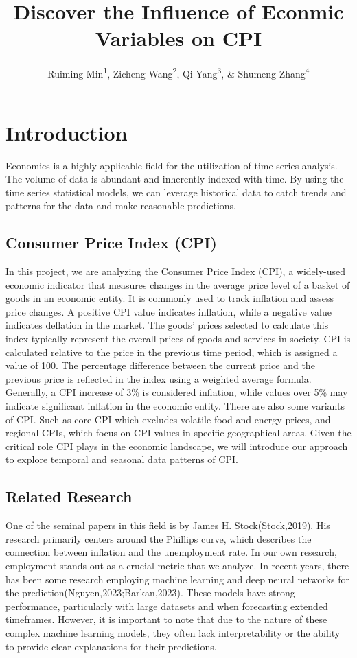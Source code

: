 \documentclass[
  man,floatsintext,
  man]{apa6}
\title{Discover the Influence of Econmic Variables on CPI}
\author{Ruiming Min\textsuperscript{1}, Zicheng Wang\textsuperscript{2}, Qi Yang\textsuperscript{3}, \& Shumeng Zhang\textsuperscript{4}}
\date{}
\affiliation{\vspace{0.5cm}\textsuperscript{5} UIUC}
\begin{document}
\maketitle

\section{Introduction}\label{introduction}

Economics is a highly applicable field for the utilization of time series analysis. The volume of data is abundant and inherently indexed with time. By using the time series statistical models, we can leverage historical data to catch trends and patterns for the data and make reasonable predictions.

\subsection{Consumer Price Index (CPI)}\label{consumer-price-index-cpi}

In this project, we are analyzing the Consumer Price Index (CPI), a widely-used economic indicator that measures changes in the average price level of a basket of goods in an economic entity. It is commonly used to track inflation and assess price changes. A positive CPI value indicates inflation, while a negative value indicates deflation in the market. The goods' prices selected to calculate this index typically represent the overall prices of goods and services in society.
CPI is calculated relative to the price in the previous time period, which is assigned a value of 100. The percentage difference between the current price and the previous price is reflected in the index using a weighted average formula. Generally, a CPI increase of 3\% is considered inflation, while values over 5\% may indicate significant inflation in the economic entity. There are also some variants of CPI. Such as core CPI which excludes volatile food and energy prices, and regional CPIs, which focus on CPI values in specific geographical areas.
Given the critical role CPI plays in the economic landscape, we will introduce our approach to explore temporal and seasonal data patterns of CPI.

\subsection{Related Research}\label{related-research}

One of the seminal papers in this field is by James H. Stock(Stock,2019). His research primarily centers around the Phillips curve, which describes the connection between inflation and the unemployment rate. In our own research, employment stands out as a crucial metric that we analyze.
In recent years, there has been some research employing machine learning and deep neural networks for the prediction(Nguyen,2023;Barkan,2023). These models have strong performance, particularly with large datasets and when forecasting extended timeframes. However, it is important to note that due to the nature of these complex machine learning models, they often lack interpretability or the ability to provide clear explanations for their predictions.
\end{document}
